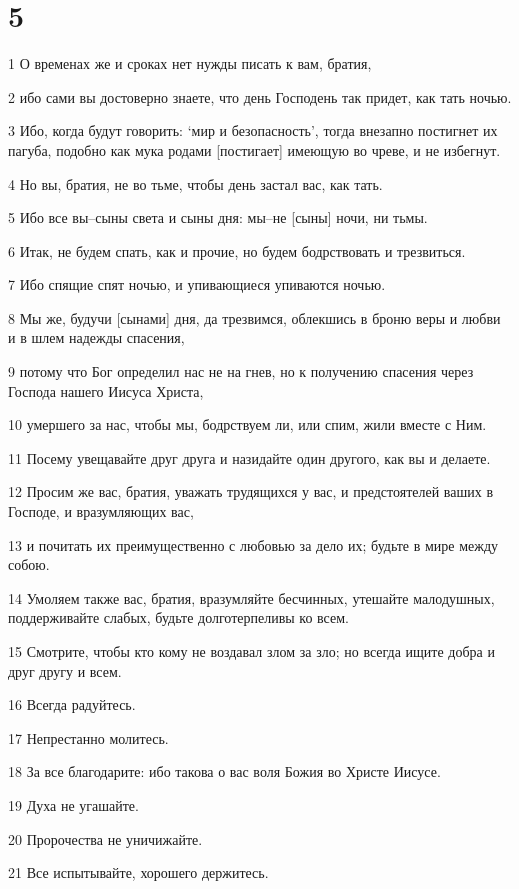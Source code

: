 \chapter{5}

\par 1 О временах же и сроках нет нужды писать к вам, братия,
\par 2 ибо сами вы достоверно знаете, что день Господень так придет, как тать ночью.
\par 3 Ибо, когда будут говорить: `мир и безопасность', тогда внезапно постигнет их пагуба, подобно как мука родами [постигает] имеющую во чреве, и не избегнут.
\par 4 Но вы, братия, не во тьме, чтобы день застал вас, как тать.
\par 5 Ибо все вы--сыны света и сыны дня: мы--не [сыны] ночи, ни тьмы.
\par 6 Итак, не будем спать, как и прочие, но будем бодрствовать и трезвиться.
\par 7 Ибо спящие спят ночью, и упивающиеся упиваются ночью.
\par 8 Мы же, будучи [сынами] дня, да трезвимся, облекшись в броню веры и любви и в шлем надежды спасения,
\par 9 потому что Бог определил нас не на гнев, но к получению спасения через Господа нашего Иисуса Христа,
\par 10 умершего за нас, чтобы мы, бодрствуем ли, или спим, жили вместе с Ним.
\par 11 Посему увещавайте друг друга и назидайте один другого, как вы и делаете.
\par 12 Просим же вас, братия, уважать трудящихся у вас, и предстоятелей ваших в Господе, и вразумляющих вас,
\par 13 и почитать их преимущественно с любовью за дело их; будьте в мире между собою.
\par 14 Умоляем также вас, братия, вразумляйте бесчинных, утешайте малодушных, поддерживайте слабых, будьте долготерпеливы ко всем.
\par 15 Смотрите, чтобы кто кому не воздавал злом за зло; но всегда ищите добра и друг другу и всем.
\par 16 Всегда радуйтесь.
\par 17 Непрестанно молитесь.
\par 18 За все благодарите: ибо такова о вас воля Божия во Христе Иисусе.
\par 19 Духа не угашайте.
\par 20 Пророчества не уничижайте.
\par 21 Все испытывайте, хорошего держитесь.
